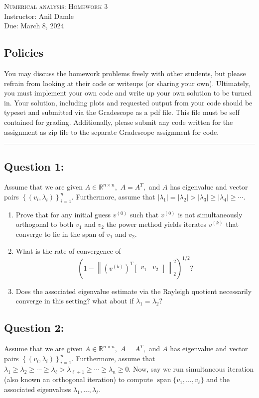 \documentclass[11pt,onecolumn]{article}
\DeclareMathOperator{\vspan}{span}
\begin{document}
\noindent
\textsc{\Large Numerical analysis: Homework 3}\\
Instructor: Anil Damle\\
Due: March 8, 2024\\

\subsection*{Policies}
You may discuss the homework problems freely with other students, but please
refrain from looking at their code or writeups (or sharing your own).
Ultimately, you must implement your own code and write up your own solution to
be turned in. Your solution, including plots and requested output from your code
should be typeset and submitted via the Gradescope as a pdf file. This file must be self contained for grading. Additionally, please
submit any code written for the assignment as zip
file to the separate Gradescope assignment for code.\\
\hrule
\vspace{1cm}
\noindent

\subsection*{Question 1:}
Assume that we are given $A\in\mathbb{R}^{n\times n},$ $A=A^T,$ and $A$ has eigenvalue and vector pairs $\left\{(v_i,\lambda_i)\right\}_{i=1}^n.$ Furthermore, assume that $\lvert\lambda_1\rvert = \lvert\lambda_2\rvert > \lvert \lambda_3\rvert \geq \lvert\lambda_4\rvert \geq \cdots.$ 

\begin{enumerate}[label=(\alph*)]
\item Prove that for any initial guess $v^{(0)}$ such that $v^{(0)}$ is not simultaneously orthogonal to both $v_1$ and $v_2$ the power method yields iterates $v^{(k)}$ that converge to lie in the span of $v_1$ and $v_2.$
\item What is the rate of convergence of $$\left(1-\left\|\left(v^{(k)}\right)^T\begin{bmatrix}v_1 & v_2\end{bmatrix}\right\|^2_2\right)^{1/2}?$$ 
\item Does the associated eigenvalue estimate via the Rayleigh quotient necessarily converge in this setting? what about if $\lambda_1 = \lambda_2?$
\end{enumerate}

\subsection*{Question 2:}
Assume that we are given $A\in\mathbb{R}^{n\times n},$ $A=A^T,$ and $A$ has eigenvalue and vector pairs $\left\{(v_i,\lambda_i)\right\}_{i=1}^n.$ Furthermore, assume that $\lambda_1 \geq \lambda_2 \geq \cdots \geq \lambda_\ell > \lambda_{\ell+1}\geq \cdots \geq \lambda_n \geq 0.$ Now, say we run simultaneous iteration (also known an orthogonal iteration) to compute $\vspan\{v_1,\ldots,v_\ell\}$ and the associated eigenvalues $\lambda_1,\ldots,\lambda_\ell.$
\end{document}
